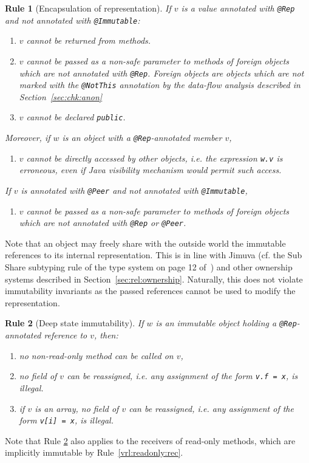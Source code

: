 \documentclass{pracamgr}
\theoremstyle{break}
\theoremstyle{break}
\theoremstyle{break}
\newtheorem{verrule}{Rule}
\begin{document}
\begin{verrule}[Encapsulation of representation]
  If $v$ is a value annotated with \texttt{@Rep} and not annotated
  with \texttt{@Immutable}:
  \begin{enumerate}[label=(\arabic*)]
  \item $v$ cannot be returned from methods. 
  \item $v$ cannot be passed as a non-safe parameter to methods of
    foreign objects which are not annotated with
    \texttt{@Rep}. Foreign objects are objects which are not marked
    with the \texttt{@NotThis} annotation by the data-flow analysis
    described in Section~\ref{sec:chk:anon}
  \item $v$ cannot be declared \texttt{public}. 
  \end{enumerate}
  Moreover, if $w$ is an object with a \texttt{@Rep}-annotated member
  $v$,
  \begin{enumerate}[label=(\arabic*), resume]
  \item $v$ cannot be directly accessed by other objects, i.e. the
    expression \texttt{w.v} is erroneous, even if Java visibility
    mechanism would permit such access.
  \end{enumerate}
  If $v$ is annotated with \texttt{@Peer} and not annotated with
  \texttt{@Immutable},
  \begin{enumerate}[label=(\arabic*), resume]
  \item $v$ cannot be passed as a non-safe parameter to methods of
    foreign objects which are not annotated with \texttt{@Rep} or
    \texttt{@Peer}.
  \end{enumerate}
\end{verrule}

Note that an object may freely share with the outside world the
immutable references to its internal representation. This is in line
with Jimuva (cf. the Sub Share subtyping rule of the type system on
page 12 of~\cite{haack}) and other ownership systems described in
Section~\ref{sec:rel:ownership}. Naturally, this does not violate
immutability invariants as the passed references cannot be used to
modify the representation.

\begin{verrule}[Deep state immutability] \label{vrl:deepimm}
  If $w$ is an immutable object holding a \texttt{@Rep}-annotated
  reference to $v$, then:
  \begin{enumerate}[label=(\arabic*)]
  \item no non-read-only method can be called on $v$, 
  \item no field of $v$ can be reassigned, i.e. any assignment of the
    form \texttt{v.f~=~x}, is illegal.
  \item \label{pnt:deep-array} if $v$ is an array, no field of $v$ can
    be reassigned, i.e. any assignment of the form \texttt{v[i]~=~x},
    is illegal.
  \end{enumerate}
\end{verrule}
Note that Rule \ref{vrl:deepimm} also applies to the receivers of
read-only methods, which are implicitly immutable by
Rule~\ref{vrl:readonly:rec}. 
\end{document}
